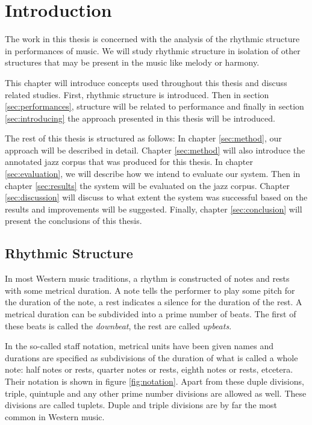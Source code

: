 \chapter{Introduction}
\label{sec:introduction}

The work in this thesis is concerned with the analysis of the rhythmic structure in performances of music. We will study rhythmic structure in isolation of other structures that may be present in the music like melody or harmony.

This chapter will introduce concepts used throughout this thesis and discuss related studies. First, rhythmic structure is introduced. Then in section \ref{sec:performances}, structure will be related to performance and finally in section \ref{sec:introducing} the approach presented in this thesis will be introduced.

The rest of this thesis is structured as follows: In chapter \ref{sec:method}, our approach will be described in detail. Chapter \ref{sec:method} will also introduce the annotated jazz corpus that was produced for this thesis. In chapter \ref{sec:evaluation}, we will describe how we intend to evaluate our system. Then in chapter \ref{sec:results} the system will be evaluated on the jazz corpus. Chapter \ref{sec:discussion} will discuss to what extent the system was successful based on the results and improvements will be suggested. Finally, chapter \ref{sec:conclusion} will present the conclusions of this thesis.

\section{Rhythmic Structure}
\label{sec:structure}

In most Western music traditions, a rhythm is constructed of notes and rests with some metrical duration. A note tells the performer to play some pitch for the duration of the note, a rest indicates a silence for the duration of the rest. A metrical duration can be subdivided into a prime number of beats. The first of these beats is called the \textit{downbeat}, the rest are called \textit{upbeats}.

In the so-called staff notation, metrical units have been given names and durations are specified as subdivisions of the duration of what is called a whole note: half notes or rests, quarter notes or rests, eighth notes or rests, etcetera. Their notation is shown in figure \ref{fig:notation}. Apart from these duple divisions, triple, quintuple and any other prime number divisions are allowed as well. These divisions are called tuplets. Duple and triple divisions are by far the most common in Western music.

